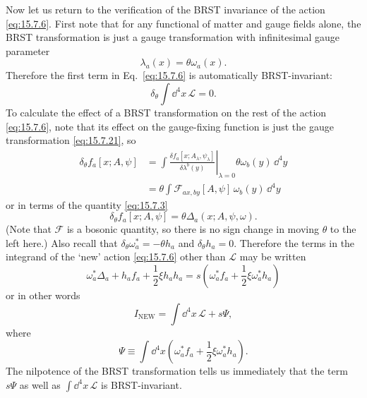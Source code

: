 Now let us return to the verification of the BRST invariance of the action \eqref{eq:15.7.6}. First note that for any functional of matter and gauge fields alone, the BRST transformation is just a gauge transformation with infinitesimal gauge parameter
\begin{equation}
 \lambda_a(x)=\theta\omega_a(x).
 \tag{15.7.21}\label{eq:15.7.21}
\end{equation}
Therefore the first term in Eq.~\eqref{eq:15.7.6} is automatically BRST-invariant:
\begin{equation}
 \delta_\theta\int \dd^4x\,\mathcal L=0.
 \tag{15.7.22}\label{eq:15.7.22}
\end{equation}
To calculate the effect of a BRST transformation on the rest of the action \eqref{eq:15.7.6}, note that its effect on the gauge-fixing function is just the gauge transformation \eqref{eq:15.7.21}, so
\begin{align*}
 \delta_\theta f_a[x;A,\psi]
 &=\int\left.\frac{\delta f_a[x;A_\lambda,\psi_\lambda]}{\delta\lambda^b(y)}\right|_{\lambda=0}
 \theta\omega_b(y)\,\dd^4y\\
 &=\theta\int \mathcal F_{a x,b y}[A,\psi]\,\omega_b(y)\,\dd^4y
\end{align*}
or in terms of the quantity \eqref{eq:15.7.3}
\begin{equation}
 \delta_\theta f_a[x;A,\psi]=\theta\Delta_a(x;A,\psi,\omega).
 \tag{15.7.23}\label{eq:15.7.23}
\end{equation}
(Note that $\mathcal F$ is a bosonic quantity, so there is no sign change in moving $\theta$ to the left here.) Also recall that $\delta_\theta\omega_a^*=-\theta h_a$ and $\delta_\theta h_a=0$. Therefore the terms in the integrand of the `new' action \eqref{eq:15.7.6} other than $\mathcal L$ may be written
\begin{equation}
 \omega_a^*\Delta_a+h_a f_a+\frac{1}{2}\xi h_a h_a
 =s\left(\omega_a^*f_a+\frac{1}{2}\xi\omega_a^*h_a\right)
 \tag{15.7.24}\label{eq:15.7.24}
\end{equation}
or in other words
\begin{equation}
 I_{\mathrm{NEW}}=\int \dd^4x\,\mathcal L+s\Psi,
 \tag{15.7.25}\label{eq:15.7.25}
\end{equation}
where
\begin{equation}
 \Psi\equiv\int \dd^4x\left(\omega_a^*f_a+\frac{1}{2}\xi\omega_a^*h_a\right).
 \tag{15.7.26}\label{eq:15.7.26}
\end{equation}
The nilpotence of the BRST transformation tells us immediately that the term $s\Psi$ as well as $\int \dd^4x\,\mathcal L$ is BRST-invariant.


